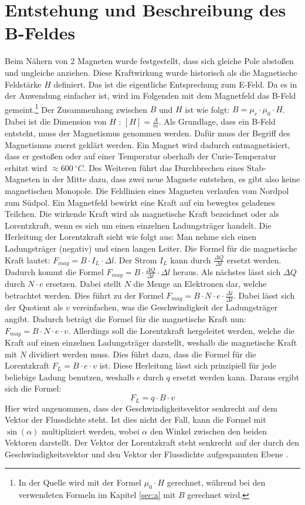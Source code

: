 \section{Entstehung und Beschreibung des B-Feldes}
Beim Nähern von 2 Magneten wurde festgestellt, dass sich gleiche Pole abstoßen und ungleiche anziehen.
Diese Kraftwirkung wurde historisch als die Magnetische Feldstärke $H$ definiert.
Das ist die eigentliche Entsprechung zum E-Feld.
Da es in der Anwendung einfacher ist, wird im Folgenden mit dem Magnetfeld das B-Feld gemeint.\footnote{In der Quelle \cite{Gente1950} wird mit der Formel $\mu_0 \cdot H$ gerechnet, während bei den verwendeten Formeln im Kapitel \ref{sec:a} mit $B$ gerechnet wird.}
Der Zusammenhang zwischen $B$ und $H$ ist wie folgt: $B = \mu_r \cdot \mu_0 \cdot H$.
Dabei ist die Dimension von $H$ : $[H] = \frac{A}{m}$.
Als Grundlage, dass ein B-Feld entsteht, muss der Magnetismus genommen werden.
Dafür muss der Begriff des Magnetismus zuerst geklärt werden.
Ein Magnet wird dadurch entmagnetisiert, dass er gestoßen oder auf einer Temperatur oberhalb der Curie-Temperatur erhitzt wird $ \approx 600 ~ ^\circ C$.
Des Weiteren führt das Durchbrechen eines Stab-Magneten in der Mitte dazu, dass zwei neue Magnete entstehen, es gibt also keine magnetischen Monopole.
Die Feldlinien eines Magneten verlaufen vom Nordpol zum Südpol.
Ein Magnetfeld bewirkt eine Kraft auf ein bewegtes geladenes Teilchen.
Die wirkende Kraft wird als magnetische Kraft bezeichnet oder als Lorentzkraft, wenn es sich um einen einzelnen Ladungsträger handelt.
Die Herleitung der Lorentzkraft sieht wie folgt aus:
Man nehme sich einen Ladungsträger (negativ) und einen langen Leiter.
Die Formel für die magnetische Kraft lautet: $F_{mag} =  B \cdot I_L \cdot \Delta l$.
Der Strom $I_L$ kann durch $\frac{\Delta Q}{\Delta t}$ ersetzt werden.
Dadurch kommt die Formel $F_{mag} = B \cdot \frac{\Delta Q}{\Delta t} \cdot \Delta l$ heraus.
Als nächstes lässt sich $\Delta Q$ durch $N \cdot e$ ersetzen.
Dabei stellt $N$ die Menge an Elektronen dar, welche betrachtet werden.
Dies führt zu der Formel $F_{mag} = B \cdot N \cdot e \cdot \frac{\Delta l}{\Delta t}$.
Dabei lässt sich der Quotient als $v$ vereinfachen, was die Geschwindigkeit der Ladungsträger angibt.
Dadurch beträgt die Formel für die magnetische Kraft nun: $F_{mag} = B \cdot N \cdot e \cdot v$.
Allerdings soll die Lorentzkraft hergeleitet werden, welche die Kraft auf einen einzelnen Ladungsträger darstellt, weshalb die magnetische Kraft mit $N$ dividiert werden muss.
Dies führt dazu, dass die Formel für die Lorentzkraft $F_L = B \cdot e \cdot v$ ist.
Diese Herleitung lässt sich prinzipiell für jede beliebige Ladung benutzen, weshalb $e$ durch $q$ ersetzt werden kann.
Daraus ergibt sich die Formel:
\begin{equation*}
    F_L = q \cdot B \cdot v
\end{equation*}
Hier wird angenommen, dass der Geschwindigkeitsvektor senkrecht auf dem Vektor der Flussdichte steht.
Ist dies nicht der Fall, kann die Formel mit $\sin(\alpha)$ multipliziert werden, wobei $\alpha$ den Winkel zwischen den beiden Vektoren darstellt.
Der Vektor der Lorentzkraft steht senkrecht auf der durch den Geschwindigkeitsvektor und den Vektor der Flussdichte aufgespannten Ebene \cite{Lorentzkraft}.

